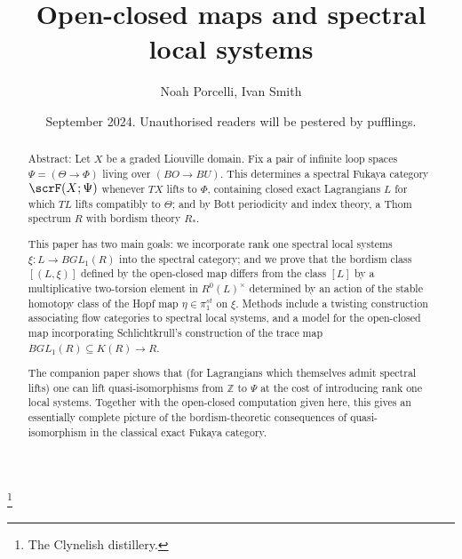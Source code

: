 \documentclass{TPmod}
\def\bZ{\mathbb{Z}}
\def\bZ{\mathbb{Z}}
\numberwithin{equation}{section}
\begin{document}
\title{Open-closed maps and spectral local systems}

\author[]{Noah Porcelli, Ivan Smith}
\thanks{The Clynelish distillery.}
\date{September 2024. Unauthorised readers will be pestered by pufflings.}


\address{Noah Porcelli, Max Planck Institute for Mathematics, Vivatsgasse 7, 53111 Bonn, Germany}
\address{Ivan Smith, Centre for Mathematical Sciences, University of Cambridge, Wilberforce Road, Cambridge CB3 0WB, U.K.}


 


\begin{abstract} {\sc Abstract:}
Let $X$ be a graded Liouville domain. Fix a pair of infinite loop spaces $\Psi = (\Theta \to \Phi)$ living over $(BO \to BU)$. This determines a spectral Fukaya category $\scrF(X;\Psi)$ whenever $TX$ lifts to $\Phi$, containing closed exact Lagrangians $L$ for which $TL$ lifts compatibly to $\Theta$; and by Bott periodicity and index theory, a Thom spectrum $R$ with bordism theory $R_*$.

This paper has two main goals: we incorporate rank one spectral local systems $\xi: L \to BGL_1(R)$ into the spectral category; and we prove that the bordism class $[(L,\xi)]$ defined by the open-closed map differs from the class $[L]$ by a multiplicative two-torsion element in $R^0(L)^{\times}$ determined by an action of the stable homotopy class of the Hopf map $\eta \in \pi_1^{st}$ on $\xi$.   Methods include a twisting construction associating flow categories to spectral local systems, and a model for the open-closed map incorporating Schlichtkrull's construction of the trace map $BGL_1(R) \subseteq K(R) \to R$.

The companion paper \cite{PS4} shows that (for Lagrangians which themselves admit spectral lifts) one can lift quasi-isomorphisms from $\bZ$ to $\Psi$ at the cost of introducing rank one local systems. Together with the open-closed computation given here, this gives an essentially complete picture of the bordism-theoretic consequences of quasi-isomorphism in the classical exact Fukaya category.
\end{abstract}

\maketitle
\thispagestyle{empty}
\setlength{\cftbeforesubsecskip}{-2pt}
\tableofcontents
\end{document}
